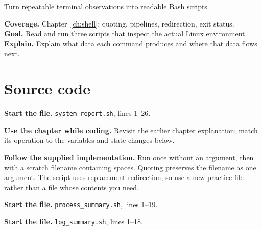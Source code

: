 \begin{labproject}{Turn repeatable terminal observations into readable Bash scripts}

\textbf{Coverage.} Chapter~\ref{ch:shell}: quoting, pipelines, redirection, exit status.\\
\textbf{Goal.} Read and run three scripts that inspect the actual Linux environment.\\
\textbf{Explain.} Explain what data each command produces and where that data flows next.




\section*{Source code}
\noindent\textbf{Start the file.} \texttt{system\_report.sh}, lines 1--26.



\textbf{Use the chapter while coding.} Revisit \hyperref[ch:shell]{the earlier chapter explanation}; match its operation to the variables and state changes below.

\textbf{Follow the supplied implementation.} Run once without an argument, then with a scratch filename containing spaces. Quoting preserves the filename as one argument. The script uses replacement redirection, so use a new practice file rather than a file whose contents you need.




\noindent\textbf{Start the file.} \texttt{process\_summary.sh}, lines 1--19.


\noindent\textbf{Start the file.} \texttt{log\_summary.sh}, lines 1--18.



\end{labproject}

